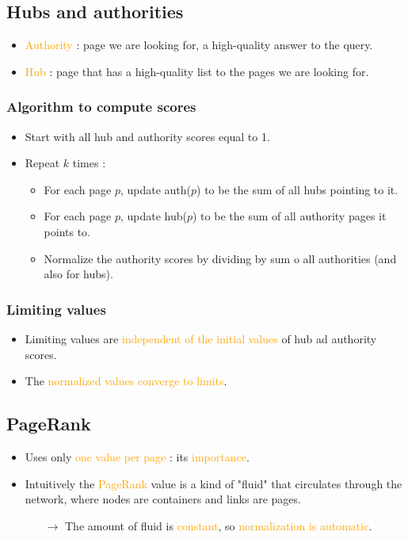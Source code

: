 \subsection{Hubs and authorities}

\begin{itemize}
\item \textcolor{orange}{Authority} : page we are looking for, a high-quality answer to the query.
\item \textcolor{orange}{Hub} : page that has a high-quality list to the pages we are looking for.
\end{itemize}

\subsubsection{Algorithm to compute scores}

\begin{itemize}
\item Start with all hub and authority scores equal to 1.
\item Repeat $k$ times :
	\begin{itemize}
	\item For each page $p$, update auth($p$) to be the sum of all hubs pointing to it.
	\item For each page $p$, update hub($p$) to be the sum of all authority pages it points to.
	\item Normalize the authority scores by dividing by sum o all authorities (and also for hubs).
	\end{itemize}
\end{itemize}

\subsubsection{Limiting values}

\begin{itemize}
\item Limiting values are \textcolor{orange}{independent of the initial values} of hub ad authority scores.
\item The \textcolor{orange}{normalized values converge to limits}.
\end{itemize}

\subsection{PageRank}

\begin{itemize}
\item Uses only \textcolor{orange}{one value per page} : its \textcolor{orange}{importance}.
\item Intuitively the \textcolor{orange}{PageRank} value is a kind of "fluid" that circulates through the network, where nodes are containers and links are pages.
	\begin{itemize}
	\item[$\rightarrow$] The amount of fluid is \textcolor{orange}{constant}, so \textcolor{orange}{normalization is automatic}.
	\end{itemize}
\end{itemize}

